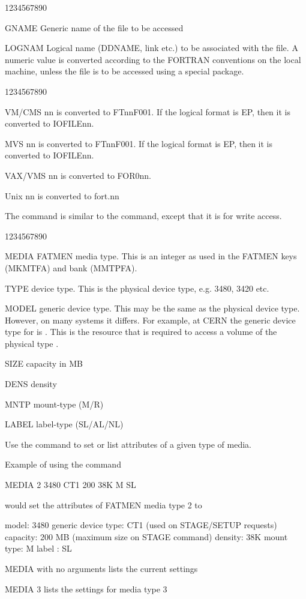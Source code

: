 \begin{DLtt}{1234567890}
\item[GNAME]Generic name of the file to be accessed
\item[LOGNAM]Logical name (DDNAME, link etc.) to be associated with
the file. A numeric value is converted according to the FORTRAN
conventions on the local machine, unless the file is to be 
accessed using a special package.
\begin{DLtt}{1234567890}
\item[VM/CMS]nn is converted to FTnnF001. If the logical format is EP,
then it is converted to IOFILEnn.
\item[MVS]nn is converted to FTnnF001. If the logical format is EP,
then it is converted to IOFILEnn.
\item[VAX/VMS]nn is converted to FOR0nn.
\item[Unix]nn is converted to fort.nn
\end{DLtt}
\end{DLtt}
The  command is similar to the  command,
except that it is for write access.
\begin{DLtt}{1234567890}
\item[MEDIA]FATMEN media type. This is an integer as used in the
FATMEN keys (MKMTFA) and bank (MMTPFA). 
\item[TYPE]device type. This is the physical device type, e.g. 3480,
3420 etc. 
\item[MODEL]generic device type. This may be the same as the physical
device type. However, on many systems it differs. For example, at CERN
the generic device type for  is .
This is the resource that is required to access a volume of the
physical type .
\item[SIZE]capacity in MB
\item[DENS]density      
\item[MNTP]mount-type (M/R)
\item[LABEL]label-type (SL/AL/NL)
\end{DLtt}
\par
Use the  command to set or list attributes of a given
type of media.
\begin{XMPt}{Example of using the \protect{} command}

MEDIA 2 3480 CT1 200 38K M SL

would set the attributes of FATMEN media type 2 to

model:               3480
generic device type: CT1 (used on STAGE/SETUP requests)
capacity:            200 MB (maximum size on STAGE command)
density:             38K
mount type:          M
label  :             SL

MEDIA with no arguments lists the current settings

MEDIA 3 lists the settings for media type 3
\end{XMPt}

